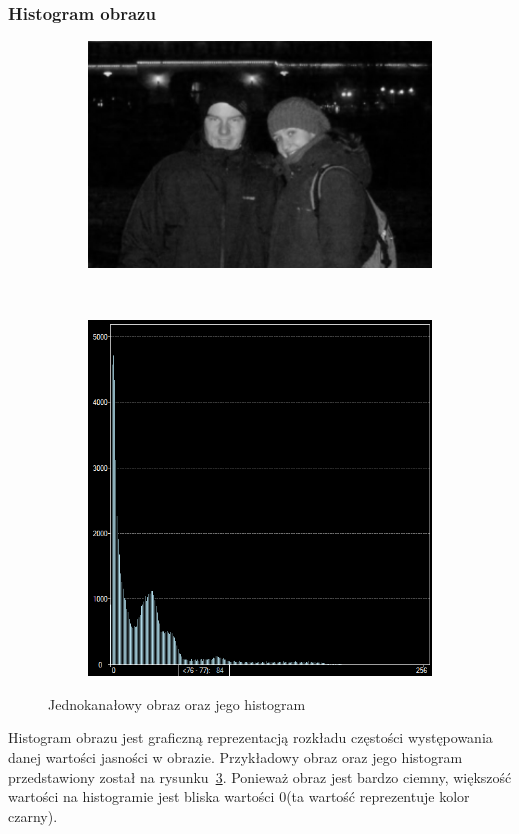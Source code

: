 \subsubsection{Histogram obrazu}
\begin{figure}
  \centering
  \begin{subfigure}[b]{0.45\textwidth}
    \includegraphics[width=\textwidth]{img/image-histogram}
    \label{fig:image_histogram}
  \end{subfigure}
  ~
  \begin{subfigure}[b]{0.45\textwidth}
    \includegraphics[width=\textwidth]{img/image-histogram-histogram}
    \label{fig:image_histogram_histogram}
  \end{subfigure}
  \caption{Jednokanałowy obraz oraz jego histogram}
  \label{fig:image_histogram_g}
\end{figure}
Histogram obrazu jest graficzną reprezentacją rozkładu częstości występowania danej wartości jasności w obrazie. Przykładowy obraz oraz jego histogram przedstawiony został na rysunku~\ref{fig:image_histogram_g}. Ponieważ obraz jest bardzo ciemny, większość wartości na histogramie jest bliska wartości 0(ta wartość reprezentuje kolor czarny).
